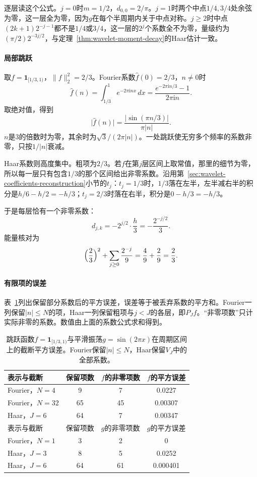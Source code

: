 逐层读这个公式。$j=0$时$m=1/2$，$d_{0,0}=2/\pi$。$j=1$时两个中点$1/4,3/4$处余弦为零，这一层全为零，因为$g$在每个半周期内关于中点对称。$j\geq2$时中点$(2k+1)2^{-j-1}$都不是$1/4$或$3/4$，这一层的$2^j$个系数全不为零，量级约为$(\pi/2)2^{-3j/2}$，与定理~\ref{thm:wavelet-moment-decay}的Haar估计一致。

\paragraph{局部跳跃}
取$f=\mathbf{1}_{[1/3,1)}$，$\lVert f\rVert_2^2=2/3$。Fourier系数$\hat f(0)=2/3$，$n\neq0$时
\[
 \hat f(n)=\int_{1/3}^1e^{-2\pi\mathrm inx}\,dx=\frac{e^{-2\pi\mathrm in/3}-1}{2\pi\mathrm in}.
\]
取绝对值，得到
\[
 \lvert\hat f(n)\rvert=\frac{\lvert\sin(\pi n/3)\rvert}{\pi\lvert n\rvert}.
\]
$n$是$3$的倍数时为零，其余时为$\sqrt3/(2\pi\lvert n\rvert)$。一处跳跃使无穷多个频率的系数非零，只按$1/\lvert n\rvert$衰减。

Haar系数则高度集中。粗项为$2/3$。若$f$在第$j$层区间上取常值，那里的细节为零，所以每一层只有包含$1/3$的那个区间给出非零系数。沿用第~\ref{sec:wavelet-coefficients-reconstruction}小节的$t_j$：$t_j=1/3$时，$1/3$落在左半，左半减右半的积分是$h/6-h/2=-h/3$；$t_j=2/3$时落在右半，积分是$0-h/3=-h/3$。

于是每层恰有一个非零系数：
\begin{equation}
 d_{j,k}=-2^{j/2}\cdot\frac{h}{3}=-\frac{2^{-j/2}}3.
 \label{eq:wavelet-jump-coefficients}
\end{equation}
能量核对为
\[
 \Bigl(\frac23\Bigr)^2+\sum_{j\geq0}\frac{2^{-j}}9=\frac49+\frac29=\frac23.
\]

\paragraph{有限项的误差}
表~\ref{tab:wavelet-fourier-haar-budget}列出保留部分系数后的平方误差，误差等于被丢弃系数的平方和。Fourier一列保留$\lvert n\rvert\leq N$的项，Haar一列保留粗项与$j<J$的各层，即$P_Jf$。“非零项数”只计实际非零的系数。数值由上面的系数公式求和得到。

\begin{table}[!htb]
\centering
\caption{跳跃函数$f=\mathbf{1}_{[1/3,1)}$与平滑振荡$g=\sin(2\pi x)$在周期区间上的截断平方误差。Fourier保留$\lvert n\rvert\leq N$，Haar保留$V_J$中的全部系数。}
\label{tab:wavelet-fourier-haar-budget}
\begin{tabular}{lccc}
\toprule
表示与截断 & 保留项数 & $f$的非零项数 & $f$的平方误差\\
\midrule
Fourier，$N=4$ & 9 & 7 & 0.0227\\
Fourier，$N=32$ & 65 & 45 & 0.00307\\
Haar，$J=6$ & 64 & 7 & 0.00347\\
\midrule
表示与截断 & 保留项数 & $g$的非零项数 & $g$的平方误差\\
\midrule
Fourier，$N=1$ & 3 & 2 & 0\\
Haar，$J=3$ & 8 & 5 & 0.0252\\
Haar，$J=6$ & 64 & 61 & 0.000401\\
\bottomrule
\end{tabular}
\end{table}

